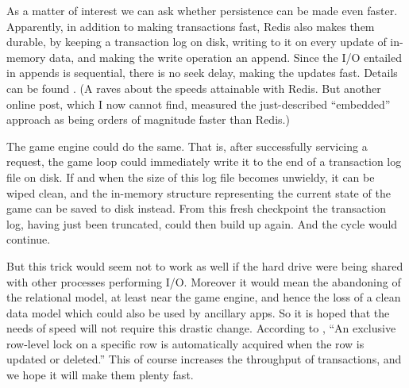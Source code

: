 As a matter of interest we can ask whether persistence can be made even faster.
Apparently, in addition to making transactions fast, Redis also makes them
durable, by keeping a transaction log on disk, writing to it on every update of
in-memory data, and making the write operation an append.
Since the I/O entailed in appends is sequential, there is no seek delay,
making the updates fast.
Details can be found
.
(A 
raves about the speeds attainable with Redis.
But another online post, which I now cannot find, measured the just-described
``embedded'' approach as being orders of magnitude faster than Redis.)

The game engine could do the same.
That is, after successfully servicing a request,
the game loop could immediately write it to the end of a transaction
log file on disk.
If and when the size of this log file becomes unwieldy,
it can be wiped clean, and the in-memory structure representing the current
state of the game can be saved to disk instead.
From this fresh checkpoint the transaction log, having just been truncated,
could then build up again.
And the cycle would continue.

But this trick would seem not to work as well if the hard drive were being
shared with other processes performing I/O. Moreover it would mean the
abandoning of the relational model, at least near the game engine, and hence
the loss of a clean data model which could also be used by ancillary apps.
So it is hoped that the needs of speed will not require this drastic change.
According to
,
``An exclusive row-level lock on a specific row is automatically acquired when
the row is updated or deleted.'' This of course increases the throughput of
transactions, and we hope it will make them plenty fast.